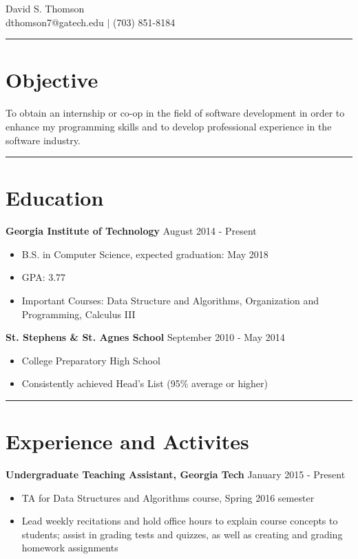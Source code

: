 \documentclass[11pt]{article}
\begin{document}
\begin{center}
{\huge David S. Thomson} \\
\vspace*{1em}
dthomson7@gatech.edu $\vert$ (703) 851-8184
\end{center}

\rule{\textwidth}{.5pt}

\section*{Objective}
To obtain an internship or co-op in the field of software development in order to enhance my programming skills and to develop professional experience in the software industry.

\rule{\textwidth}{.5pt}

\section*{Education}
\textbf{Georgia Institute of Technology} \hfill August 2014 - Present
\begin{itemize}
\setlength\itemsep{0.5pt}
    \item B.S. in Computer Science, expected graduation: May 2018
    \item GPA: 3.77
    \item Important Courses: Data Structure and Algorithms, Organization and Programming, Calculus III %
\end{itemize}

\textbf{St. Stephens \& St. Agnes School} \hfill September 2010 - May 2014
\begin{itemize}
\setlength\itemsep{0.5pt}
    \item College Preparatory High School
    \item Consistently achieved Head's List (95\% average or higher)
\end{itemize}

\rule{\textwidth}{.5pt}

\section*{Experience and Activites}
\textbf{Undergraduate Teaching Assistant, Georgia Tech} \hfill January 2015 - Present
\begin{itemize}
\setlength\itemsep{0.5pt}
    \item TA for Data Structures and Algorithms course, Spring 2016 semester
    \item Lead weekly recitations and hold office hours to explain course concepts to students; assist in grading tests and quizzes, as well as creating and grading homework assignments
\end{itemize}
\end{document}

